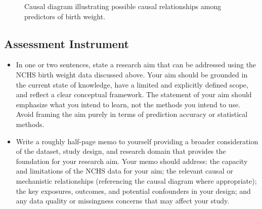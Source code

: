 \begin{figure}
\begin{center}
\end{center}
\caption{Causal diagram illustrating possible causal relationships among predictors of birth weight. \label{bw-diagram}}
\end{figure}

\subsection{Assessment Instrument}

\begin{itemize}
    \item In one or two sentences, state a research aim that can be addressed using the NCHS birth weight data discussed above. Your aim should be grounded in the current state of knowledge, have a limited and explicitly defined scope, and reflect a clear conceptual framework. The statement of your aim should emphasize what you intend to learn, not the methods you intend to use. Avoid framing the aim purely in terms of prediction accuracy or statistical methods.
    \item Write a roughly half-page memo to yourself providing a broader consideration of the dataset, study design, and research domain that provides the foundation for your research aim. Your memo should address: the capacity and limitations of the NCHS data for your aim; the relevant causal or mechanistic relationships (referencing the causal diagram where appropriate); the key exposures, outcomes, and potential confounders in your design; and any data quality or missingness concerns that may affect your study.
\end{itemize}

